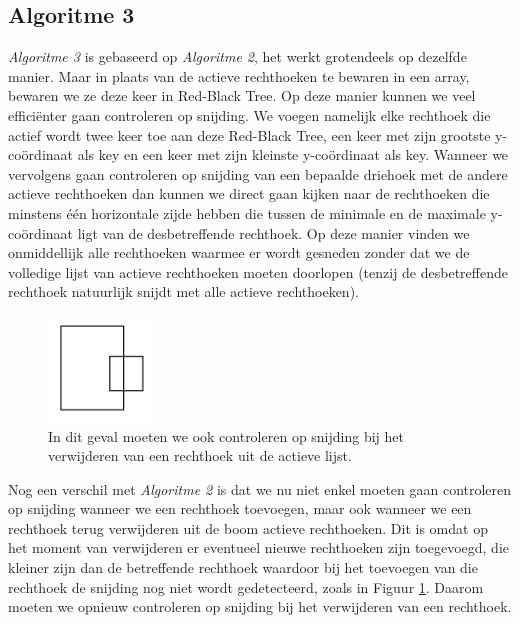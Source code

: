 \documentclass[11pt,a4paper,titlepage]{article}
\begin{document}
	\subsection{Algoritme 3}
	\emph{Algoritme 3} is gebaseerd op \emph{Algoritme 2}, het werkt grotendeels op dezelfde manier. Maar in plaats van de actieve rechthoeken te bewaren in een array, bewaren we ze deze keer in Red-Black Tree. Op deze manier kunnen we veel efficiënter gaan controleren op snijding. We voegen namelijk elke rechthoek die actief wordt twee keer toe aan deze Red-Black Tree, een keer met zijn grootste y-coördinaat als key en een keer met zijn kleinste y-coördinaat als key.  Wanneer we vervolgens gaan controleren op snijding van een bepaalde driehoek met de andere actieve rechthoeken dan kunnen we direct gaan kijken naar de rechthoeken die minstens één horizontale zijde hebben die tussen de minimale en de maximale y-coördinaat ligt van de desbetreffende rechthoek. Op deze manier vinden we onmiddellijk alle rechthoeken waarmee er wordt gesneden zonder dat we de volledige lijst van actieve rechthoeken moeten doorlopen (tenzij de desbetreffende rechthoek natuurlijk snijdt met alle actieve rechthoeken). 
	\begin{figure}
		\centering
		\includegraphics[width=0.25\textwidth]{rechthoekenAlgo3}
		\caption{\label{rechthoekenAlgo3} In dit geval moeten we ook controleren op snijding bij het verwijderen van een rechthoek uit de actieve lijst.}
	\end{figure}
	Nog een verschil met \emph{Algoritme 2} is dat we nu niet enkel moeten gaan controleren op snijding wanneer we een rechthoek toevoegen, maar ook wanneer we een rechthoek terug verwijderen uit de boom actieve rechthoeken. Dit is omdat op het moment van verwijderen er eventueel nieuwe rechthoeken zijn toegevoegd, die kleiner zijn dan de betreffende rechthoek waardoor bij het toevoegen van die rechthoek de snijding nog niet wordt gedetecteerd, zoals in Figuur \ref{rechthoekenAlgo3}. Daarom moeten we opnieuw controleren op snijding bij het verwijderen van een rechthoek. \\ \\
	
\end{document}
